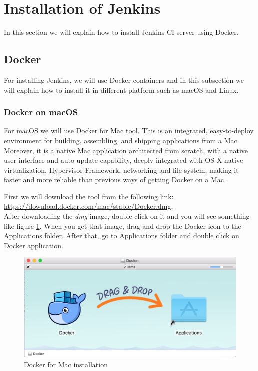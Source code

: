 \section{Installation of Jenkins}
In this section we will explain how to install Jenkins CI server using Docker.

\subsection{Docker}
For installing Jenkins, we will use Docker containers and in this subsection we will explain how to install it in different platform such as macOS and Linux.

\subsubsection{Docker on macOS}
For macOS we will use Docker for Mac tool. This is an integrated, easy-to-deploy environment for building, assembling, and shipping applications from a Mac. Moreover, it is a native Mac application architected from scratch, with a native user interface and auto-update capability, deeply integrated with OS X native virtualization, Hypervisor Framework, networking and file system, making it faster and more reliable than previous ways of getting Docker on a Mac \cite{Docker}.

First we will download the tool from the following link: \url{https://download.docker.com/mac/stable/Docker.dmg}.\\

After downloading the \textit{dmg} image, double-click on it and you will see something like figure \ref{fig:docker-mac-01}. When you get that image, drag and drop the Docker icon to the Applications folder. After that, go to Applications folder and double click on Docker application.

\begin{figure}[ht]
	\centering
    \includegraphics[width=\textwidth]{grafiken/docker-01}
    \caption{Docker for Mac installation}
    \label{fig:docker-mac-01}
\end{figure}

